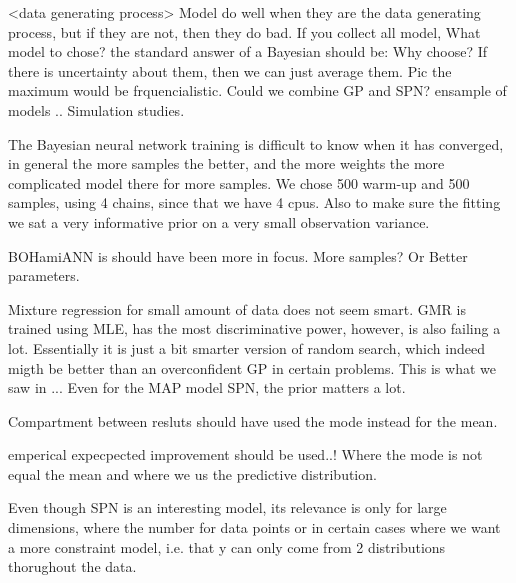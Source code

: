 
<data generating process>
Model do well when they are the data generating process, but if they are not, then
they do bad. If you collect all model, 
What model to chose? the standard answer of a Bayesian should be: Why choose? If there 
is uncertainty about them, then we can just average them. Pic the maximum would be frquencialistic.
Could we combine GP and SPN?
ensample of models ..
Simulation studies. 


The Bayesian neural network training is difficult to know when it has converged, in general the more samples the better, 
and the more weights the more complicated model there for more samples. We chose 500 warm-up and 500 samples, using 4
chains, since that we have 4 cpus. Also to make sure the fitting we sat a very informative prior on a very small observation
variance. 

BOHamiANN is should have been more in focus. More samples? Or Better parameters. 

Mixture regression for small amount of data does not seem smart. GMR is trained using MLE, has the most discriminative power,
however, is also failing a lot. Essentially it is just a bit smarter version of random search, which indeed migth be
better than an overconfident GP in certain problems. This is what we saw in ... Even for the MAP model SPN, the prior
matters a lot. 

Compartment between resluts should have used the mode instead for the mean. 

emperical expecpected improvement should be used..! Where the mode is not equal the mean and where we
us the predictive distribution. 

Even though SPN is an interesting model, its relevance is only for large dimensions, where the number for data points
or in certain cases where we want a more constraint model, i.e. that y can only come from 2 distributions thorughout the
data. 

